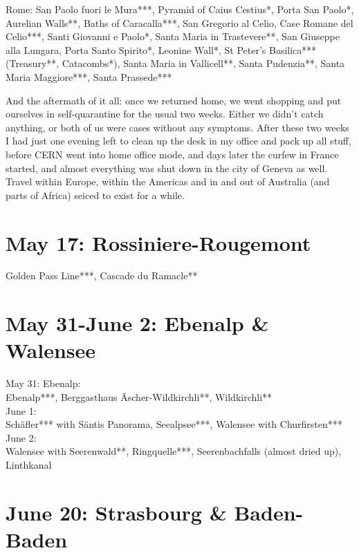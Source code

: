 Rome: San Paolo fuori le Mura***, Pyramid of Caius Cestius*, Porta San Paolo*, Aurelian Walls**, Baths of Caracalla***, San Gregorio al Celio, Case Romane del Celio***, Santi Giovanni e Paolo*, Santa Maria in Trastevere**, San Giuseppe alla Lungara, Porta Santo Spirito*, Leonine Wall*, St Peter's Basilica*** (Treasury**, Catacombs*), Santa Maria in Vallicell**, Santa Pudenzia**, Santa Maria Maggiore***, Santa Prassede*** %

 And the aftermath of it all: once we returned home, we went shopping and put ourselves in self-quarantine for the usual two weeks. Either we didn't catch anything, or both of us were cases without any symptoms. After these two weeks I had just one evening left to clean up the desk in my office and pack up all stuff, before CERN went into home office mode, and days later the curfew in France started, and almost everything was shut down in the city of Geneva as well. Travel within Europe, within the Americas and in and out of Australia (and parts of Africa) seiced to exist for a while.\\
 
 \section{May 17: Rossiniere-Rougemont}
\label{2020:Rossiniere}

Golden Pass Line***, Cascade du Ramacle**

 \section{May 31-June 2: Ebenalp \& Walensee}
\label{2020:PentacostHike}

May 31: Ebenalp:\\

Ebenalp***, Berggasthaus \"Ascher-Wildkirchli**, Wildkirchli**\\

June 1:\\

Sch\"afler*** with S\"antis Panorama, Seealpsee***, Walensee with Churfirsten***\\

June 2:\\
Walensee with Seerenwald**, Ringquelle***, Seerenbachfalls (almost dried up), Linthkanal\\

 \section{June 20: Strasbourg \& Baden-Baden}
\label{2020:Strasbourg}

